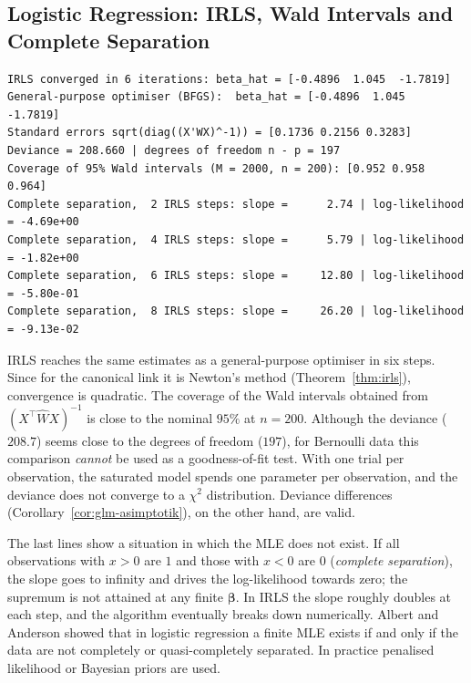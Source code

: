 \documentclass[main.tex]{subfiles}
\begin{document}
\subsection{Logistic Regression: IRLS, Wald Intervals and Complete Separation}

\begin{lstlisting}[style=output]
IRLS converged in 6 iterations: beta_hat = [-0.4896  1.045  -1.7819]
General-purpose optimiser (BFGS):  beta_hat = [-0.4896  1.045  -1.7819]
Standard errors sqrt(diag((X'WX)^-1)) = [0.1736 0.2156 0.3283]
Deviance = 208.660 | degrees of freedom n - p = 197
Coverage of 95% Wald intervals (M = 2000, n = 200): [0.952 0.958 0.964]
Complete separation,  2 IRLS steps: slope =      2.74 | log-likelihood = -4.69e+00
Complete separation,  4 IRLS steps: slope =      5.79 | log-likelihood = -1.82e+00
Complete separation,  6 IRLS steps: slope =     12.80 | log-likelihood = -5.80e-01
Complete separation,  8 IRLS steps: slope =     26.20 | log-likelihood = -9.13e-02
\end{lstlisting}

IRLS reaches the same estimates as a general-purpose optimiser in six steps. Since for the canonical link it is Newton's method (Theorem~\ref{thm:irls}), convergence is quadratic. The coverage of the Wald intervals obtained from $(X^\top\hat WX)^{-1}$ is close to the nominal $95\%$ at $n=200$. Although the deviance ($208.7$) seems close to the degrees of freedom ($197$), for Bernoulli data this comparison \emph{cannot} be used as a goodness-of-fit test. With one trial per observation, the saturated model spends one parameter per observation, and the deviance does not converge to a $\chi^2$ distribution. Deviance differences (Corollary~\ref{cor:glm-asimptotik}), on the other hand, are valid.

The last lines show a situation in which the MLE does not exist. If all observations with $x>0$ are $1$ and those with $x<0$ are $0$ (\emph{complete separation}), the slope goes to infinity and drives the log-likelihood towards zero; the supremum is not attained at any finite $\bm\beta$. In IRLS the slope roughly doubles at each step, and the algorithm eventually breaks down numerically. Albert and Anderson \cite{albert-anderson84} showed that in logistic regression a finite MLE exists if and only if the data are not completely or quasi-completely separated. In practice penalised likelihood or Bayesian priors are used.
\end{document}
